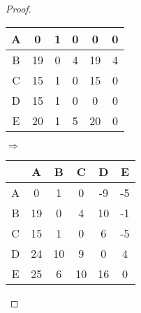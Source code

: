 \begin{proof}
\begin{tabular}{c|c|c|c|c|c}
\hline
A & 0 & 1 & 0 & 0 & 0\\
\hline
B & 19 & 0 & 4 & 19 & 4\\
\hline
C & 15 & 1 & 0 & 15 & 0\\
\hline 
D & 15 & 1 & 0 & 0 & 0\\
\hline
E & 20 & 1 & 5 & 20 & 0\\
\end{tabular}
\quad $\Rightarrow$ \quad
\begin{tabular}{c|c|c|c|c|c}
$ $ & A & B & C & D & E \\
\hline
A & 0 & 1 & 0 & -9 & -5\\
\hline
B & 19 & 0 & 4 & 10 & -1\\
\hline
C & 15 & 1 & 0 & 6 & -5\\
\hline
D & 24 & 10 & 9 & 0 & 4\\
\hline
E & 25 & 6 & 10 & 16 & 0\\
\end{tabular}
\end{proof}